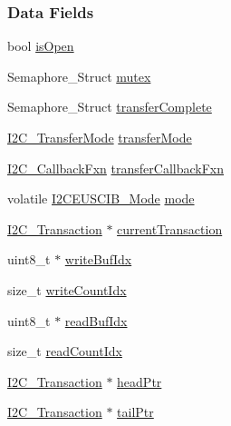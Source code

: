 \subsubsection*{Data Fields}
\begin{DoxyCompactItemize}
\item 
bool \hyperlink{struct_i2_c_e_u_s_c_i_b___object_a7a2541b1447de3860487e969cd9db507}{is\+Open}
\item 
Semaphore\+\_\+\+Struct \hyperlink{struct_i2_c_e_u_s_c_i_b___object_a7f263e57e9392a99fb21710d1ec990d8}{mutex}
\item 
Semaphore\+\_\+\+Struct \hyperlink{struct_i2_c_e_u_s_c_i_b___object_a668ac546b43712a7a213b2fb67a9870d}{transfer\+Complete}
\item 
\hyperlink{_i2_c_8h_a39f3b9340fc4ee241b0d2da9b2841c26}{I2\+C\+\_\+\+Transfer\+Mode} \hyperlink{struct_i2_c_e_u_s_c_i_b___object_aa853cc61dff83c4c4a61fee8e5ef5b93}{transfer\+Mode}
\item 
\hyperlink{_i2_c_8h_aa7389002843eba77425c73b441358fd1}{I2\+C\+\_\+\+Callback\+Fxn} \hyperlink{struct_i2_c_e_u_s_c_i_b___object_a8c7f61de39b730b75e03149794e31b1b}{transfer\+Callback\+Fxn}
\item 
volatile \hyperlink{_i2_c_e_u_s_c_i_b_8h_a340ba5aa9e4c5a5a8d139aa77d40f63d}{I2\+C\+E\+U\+S\+C\+I\+B\+\_\+\+Mode} \hyperlink{struct_i2_c_e_u_s_c_i_b___object_af9284a5e79170856bc944337c3b4336a}{mode}
\item 
\hyperlink{struct_i2_c___transaction}{I2\+C\+\_\+\+Transaction} $\ast$ \hyperlink{struct_i2_c_e_u_s_c_i_b___object_af76ab0c0557e406ff498a9956662a2cc}{current\+Transaction}
\item 
uint8\+\_\+t $\ast$ \hyperlink{struct_i2_c_e_u_s_c_i_b___object_a15430021a10c33816ea4fa1541c83bb6}{write\+Buf\+Idx}
\item 
size\+\_\+t \hyperlink{struct_i2_c_e_u_s_c_i_b___object_aa357dd4520e3dee44eba38616ee4fe83}{write\+Count\+Idx}
\item 
uint8\+\_\+t $\ast$ \hyperlink{struct_i2_c_e_u_s_c_i_b___object_ab670817ea9d58e86c0fae83305af13ef}{read\+Buf\+Idx}
\item 
size\+\_\+t \hyperlink{struct_i2_c_e_u_s_c_i_b___object_a2d9a88686967841645c4e7c1184f8b5a}{read\+Count\+Idx}
\item 
\hyperlink{struct_i2_c___transaction}{I2\+C\+\_\+\+Transaction} $\ast$ \hyperlink{struct_i2_c_e_u_s_c_i_b___object_a59c7dc75172c8cec5a6026a903d201f7}{head\+Ptr}
\item 
\hyperlink{struct_i2_c___transaction}{I2\+C\+\_\+\+Transaction} $\ast$ \hyperlink{struct_i2_c_e_u_s_c_i_b___object_a3a751caf7a6cbb75973b27ab13ab8cff}{tail\+Ptr}
\end{DoxyCompactItemize}


